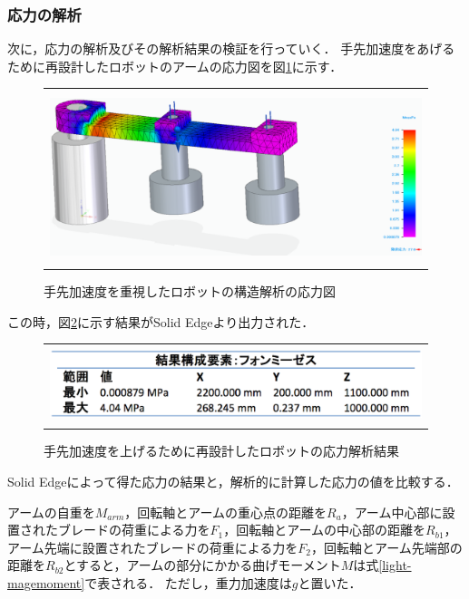 \subsubsection{応力の解析}\label{ux5fdcux529bux306eux89e3ux6790}

次に，応力の解析及びその解析結果の検証を行っていく．
手先加速度をあげるために再設計したロボットのアームの応力図を図\ref{light-ouryoku}に示す．

\begin{figure}[htbp]
  \begin{center}
    \begin{tabular}{c}
      \includegraphics[height=5.0cm]{img/eps/light-ouryoku.eps}
    \end{tabular}
    \caption{手先加速度を重視したロボットの構造解析の応力図}
    \label{light-ouryoku}
  \end{center}
\end{figure}

この時，図\ref{light-ouryoku-result}に示す結果がSolid
Edgeより出力された．

\begin{figure}[htbp]
  \begin{center}
    \begin{tabular}{c}
      \includegraphics[height=2.2cm]{img/eps/light-ouryoku-result.eps}
    \end{tabular}
    \caption{手先加速度を上げるために再設計したロボットの応力解析結果}
    \label{light-ouryoku-result}
  \end{center}
\end{figure}

Solid Edgeによって得た応力の結果と，解析的に計算した応力の値を比較する．

アームの自重を\(M_{arm}\)，回転軸とアームの重心点の距離を\(R_a\)，アーム中心部に設置されたブレードの荷重による力を\(F_1\)，回転軸とアームの中心部の距離を\(R_{b1}\)，アーム先端に設置されたブレードの荷重による力を\(F_2\)，回転軸とアーム先端部の距離を\(R_{b2}\)とすると，アームの部分にかかる曲げモーメント\(M\)は式\ref{light-magemoment}で表される．
ただし，重力加速度は\(g\)と置いた．

